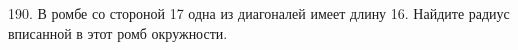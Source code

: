 190. В ромбе со стороной 17 одна из диагоналей имеет длину 16. Найдите радиус вписанной в этот ромб окружности.\\
